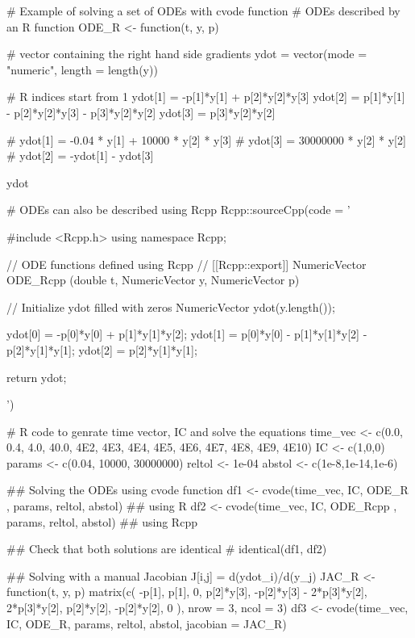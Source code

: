 \documentclass[letterpaper]{book}
\begin{document}
\begin{Examples}
\begin{ExampleCode}
# Example of solving a set of ODEs with cvode function
# ODEs described by an R function
ODE_R <- function(t, y, p){

  # vector containing the right hand side gradients
  ydot = vector(mode = "numeric", length = length(y))

  # R indices start from 1
  ydot[1] = -p[1]*y[1] + p[2]*y[2]*y[3]
  ydot[2] = p[1]*y[1] - p[2]*y[2]*y[3] - p[3]*y[2]*y[2]
  ydot[3] = p[3]*y[2]*y[2]

  # ydot[1] = -0.04 * y[1] + 10000 * y[2] * y[3]
  # ydot[3] = 30000000 * y[2] * y[2]
  # ydot[2] = -ydot[1] - ydot[3]

  ydot

}

# ODEs can also be described using Rcpp
Rcpp::sourceCpp(code = '

                #include <Rcpp.h>
                using namespace Rcpp;

                // ODE functions defined using Rcpp
                // [[Rcpp::export]]
                NumericVector ODE_Rcpp (double t, NumericVector y, NumericVector p){

                // Initialize ydot filled with zeros
                NumericVector ydot(y.length());

                ydot[0] = -p[0]*y[0] + p[1]*y[1]*y[2];
                ydot[1] = p[0]*y[0] - p[1]*y[1]*y[2] - p[2]*y[1]*y[1];
                ydot[2] = p[2]*y[1]*y[1];

                return ydot;

                }')



# R code to genrate time vector, IC and solve the equations
time_vec <- c(0.0, 0.4, 4.0, 40.0, 4E2, 4E3, 4E4, 4E5, 4E6, 4E7, 4E8, 4E9, 4E10)
IC <- c(1,0,0)
params <- c(0.04, 10000, 30000000)
reltol <- 1e-04
abstol <- c(1e-8,1e-14,1e-6)

## Solving the ODEs using cvode function
df1 <- cvode(time_vec, IC, ODE_R , params, reltol, abstol)           ## using R
df2 <- cvode(time_vec, IC, ODE_Rcpp , params, reltol, abstol)        ## using Rcpp

## Check that both solutions are identical
# identical(df1, df2)

## Solving with a manual Jacobian  J[i,j] = d(ydot_i)/d(y_j)
JAC_R <- function(t, y, p) {
  matrix(c(
    -p[1],         p[1],                        0,
     p[2]*y[3],   -p[2]*y[3] - 2*p[3]*y[2],   2*p[3]*y[2],
     p[2]*y[2],   -p[2]*y[2],                  0
  ), nrow = 3, ncol = 3)
}
df3 <- cvode(time_vec, IC, ODE_R, params, reltol, abstol, jacobian = JAC_R)
\end{ExampleCode}
\end{Examples}
\end{document}
